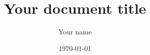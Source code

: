 \documentclass[11pt, a4paper]{jsarticle}
\title{Your document title}
\author{Your name}
\date{\today}
\begin{document}
	\thispagestyle{empty}
	\maketitle
	
	\begin{multicols}{2}
		\thispagestyle{fancy}
		\setcounter{page}{1}
		

		
		
	\end{multicols}
\end{document}
